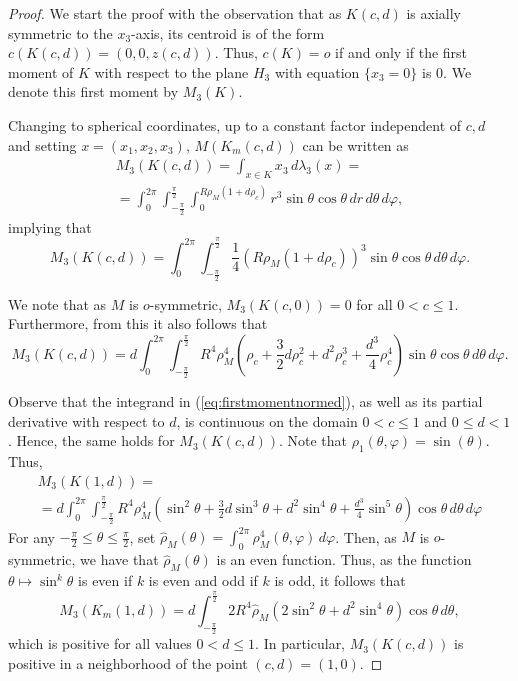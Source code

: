\documentclass[10pt,a4paper]{amsart}
\begin{document}
\begin{proof}
We start the proof with the observation that as $K(c,d)$ is axially symmetric to the $x_3$-axis, its centroid is of the form $c(K(c,d))=(0,0,z(c,d))$. Thus, $c(K)=o$ if and only if the first moment of $K$ with respect to the plane $H_3$ with equation $\{ x_3 = 0 \}$ is $0$. We denote this first moment by $M_3(K)$.

Changing to spherical coordinates, up to a constant factor independent of $c,d$ and setting $x=(x_1,x_2,x_3)$, $M(K_m(c,d))$ can be written as
\begin{multline*}
M_3(K(c,d)) = \int_{x \in K} x_3  \, d \lambda_3(x) =\\
= 
\int_{0}^{2\pi}\int_{-\frac{\pi}{2}}^{\frac{\pi}{2}}\int_{0}^{R \rho_M(1 + d \rho_c)} r^3 \sin \theta \cos \theta \,dr\,d\theta\,d\varphi,
\end{multline*}
implying that
\begin{equation}\label{eq:firstmomentnormed}
M_3(K(c,d)) = \int_{0}^{2\pi}\int_{-\frac{\pi}{2}}^{\frac{\pi}{2}} \frac{1}{4} \left( R \rho_M(1 + d \rho_c) \right)^3 \sin \theta \cos \theta \,d\theta\,d\varphi .
\end{equation}

We note that as $M$ is $o$-symmetric, $M_3(K(c,0))=0$ for all $0 < c \leq 1$. Furthermore, from this it also follows that
\begin{equation}\label{eq:firstmomentnormedmod}
M_3(K(c,d)) = d \int_{0}^{2\pi}\int_{-\frac{\pi}{2}}^{\frac{\pi}{2}}  R^4 \rho_M^4 \left( \rho_c + \frac{3}{2} d \rho_c^2 + d^2 \rho_c^3 + \frac{d^3}{4} \rho_c^4\right) \sin \theta \cos \theta \,d\theta\,d\varphi .
\end{equation}

Observe that the integrand in (\ref{eq:firstmomentnormed}), as well as its partial derivative with respect to $d$, is continuous on the domain $0 < c \leq 1$ and $0 \leq d < 1$. Hence, the same holds for $M_3(K(c,d))$.
Note that $\rho_1(\theta, \varphi) = \sin(\theta)$. Thus,
\begin{multline*}
M_3(K(1,d)) =\\
= d \int_{0}^{2\pi}\int_{-\frac{\pi}{2}}^{\frac{\pi}{2}}  R^4 \rho_M^4 \left( \sin^2 \theta + \frac{3}{2} d \sin^3 \theta + d^2 \sin^4 \theta + \frac{d^3}{4} \sin^5 \theta\right) \cos \theta \,d\theta\,d\varphi
\end{multline*}
For any $-\frac{\pi}{2} \leq \theta \leq \frac{\pi}{2}$, set $\hat{\rho}_M(\theta) = \int_{0}^{2\pi} \rho_M^4(\theta,\varphi) \, d \varphi$. Then, as $M$ is $o$-symmetric, we have that $\hat{\rho}_M(\theta)$ is an even function. Thus, as the function $\theta \mapsto \sin^k \theta$ is even if $k$ is even and odd if $k$ is odd, it follows that
\begin{equation}\label{eq:firstmomentc1_2normed}
M_3(K_m(1,d)) = d \int_{-\frac{\pi}{2}}^{\frac{\pi}{2}}  2 R^4 \hat{\rho}_M \left( 2 \sin^2 \theta  + d^2 \sin^4 \theta \right) \cos \theta \,d\theta,
\end{equation}
which is positive for all values $0<d \leq 1$. In particular, $M_3(K(c,d))$ is positive in a neighborhood of the point $(c,d)=(1,0)$.


\end{proof}
\end{document}
